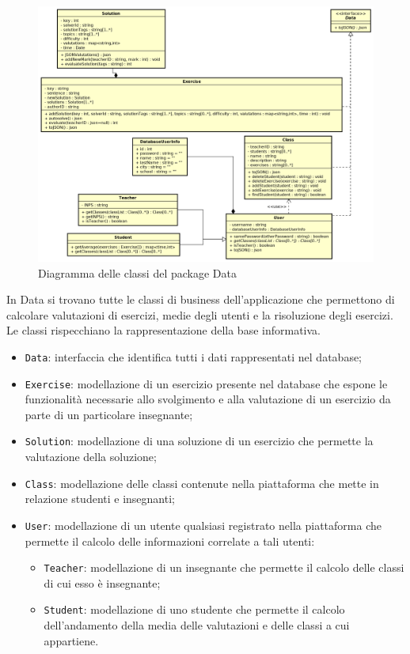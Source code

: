 \begin{figure}[ht]
	\includegraphics[scale=0.45]{images/Data.png}
	\caption{Diagramma delle classi del package Data}
\end{figure}

In Data si trovano tutte le classi di business dell'applicazione che permettono di calcolare valutazioni di esercizi, medie degli utenti e la risoluzione degli esercizi. Le classi rispecchiano la rappresentazione della base informativa.

\begin{itemize}
	\item \texttt{Data}: interfaccia che identifica tutti i dati rappresentati nel database;
	\item \texttt{Exercise}: modellazione di un esercizio presente nel database che espone le funzionalità necessarie allo svolgimento e alla valutazione di un esercizio da parte di un particolare insegnante;
	\item	\texttt{Solution}: modellazione di una soluzione di un esercizio che permette la valutazione della soluzione;
	\item \texttt{Class}: modellazione delle classi contenute nella piattaforma che mette in relazione studenti e insegnanti;
	\item \texttt{User}: modellazione di un utente qualsiasi registrato nella piattaforma che permette il calcolo delle informazioni correlate a tali utenti:
	\begin{itemize}
		\item \texttt{Teacher}: modellazione di un insegnante che permette il calcolo delle classi di cui esso è insegnante;
		\item \texttt{Student}: modellazione di uno studente che permette il calcolo dell'andamento della media delle valutazioni e delle classi a cui appartiene.
	\end{itemize}
\end{itemize}
